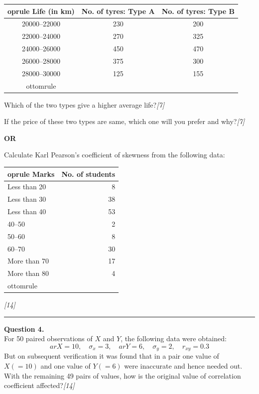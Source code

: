 \documentclass[11pt,a4paper]{article}
\newcommand{\pts}[1]{\hfill   \textit{[#1]}}
\begin{document}
\begin{center}
  
\begin{tabular}{ccc}
     oprule
   \textbf{Life (in km)} &   \textbf{No. of tyres: Type A} &   \textbf{No. of tyres: Type B} \\
    \midrule
    20000--22000 & 230 & 200 \\
    22000--24000 & 270 & 325 \\
    24000--26000 & 450 & 470 \\
    26000--28000 & 375 & 300 \\
    28000--30000 & 125 & 155 \\
    ottomrule
  \end{tabular}
\end{center}

\begin{parts}
  \item Which of the two types give a higher average life?\pts{7}
  \item If the price of these two types are same, which one will you prefer and why?\pts{7}
\end{parts}

\centerline{   \textbf{OR}}

Calculate Karl Pearson's coefficient of skewness from the following data:

\begin{center}
  
\begin{tabular}{lr}
     oprule
   \textbf{Marks} &   \textbf{No. of students} \\
    \midrule
    Less than 20 & 8 \\
    Less than 30 & 38 \\
    Less than 40 & 53 \\
    40--50 & 2 \\
    50--60 & 8 \\
    60--70 & 30 \\
    More than 70 & 17 \\
    More than 80 & 4 \\
    ottomrule
  \end{tabular}
\end{center}\pts{14}

\medskip\rule{\linewidth}{0.2pt}




\noindent   \textbf{Question 4.} \\
For 50 paired observations of $X$ and $Y$, the following data were obtained:
\[ ar{X} = 10, \quad \sigma_x = 3, \quad ar{Y} = 6, \quad \sigma_y = 2, \quad r_{xy} = 0.3 \]
But on subsequent verification it was found that in a pair one value of $X (= 10)$ and one value of $Y (= 6)$ were inaccurate and hence needed out. With the remaining 49 pairs of values, how is the original value of correlation coefficient affected?\pts{14}
\end{document}
